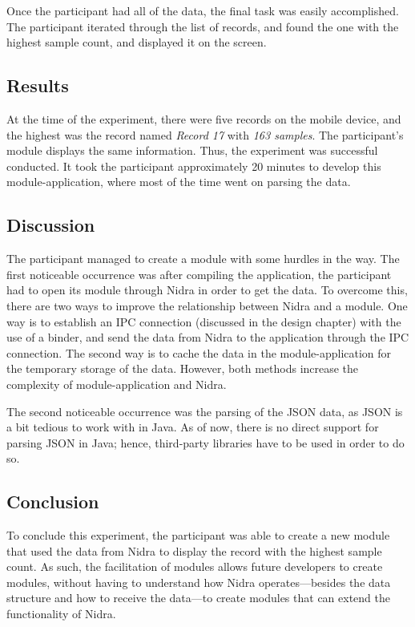 Once the participant had all of the data, the final task was easily accomplished. The participant iterated through the list of records, and found the one with the highest sample count, and displayed it on the screen. 

\subsection{Results}

At the time of the experiment, there were five records on the mobile device, and the highest was the record named \textit{Record 17} with \textit{163 samples}. The participant's module displays the same information. Thus, the experiment was successful conducted. It took the participant approximately 20 minutes to develop this module-application, where most of the time went on parsing the data.

\subsection{Discussion}

The participant managed to create a module with some hurdles in the way. The first noticeable occurrence was after compiling the application, the participant had to open its module through Nidra in order to get the data. To overcome this, there are two ways to improve the relationship between Nidra and a module. One way is to establish an IPC connection (discussed in the design chapter) with the use of a binder, and send the data from Nidra to the application through the IPC connection. The second way is to cache the data in the module-application for the temporary storage of the data. However, both methods increase the complexity of module-application and Nidra. 

The second noticeable occurrence was the parsing of the JSON data, as JSON is a bit tedious to work with in Java. As of now, there is no direct support for parsing JSON in Java; hence, third-party libraries have to be used in order to do so. 

\subsection{Conclusion}

To conclude this experiment, the participant was able to create a new module that used the data from Nidra to display the record with the highest sample count. As such, the facilitation of modules allows future developers to create modules, without having to understand how Nidra operates---besides the data structure and how to receive the data---to create modules that can extend the functionality of Nidra.

